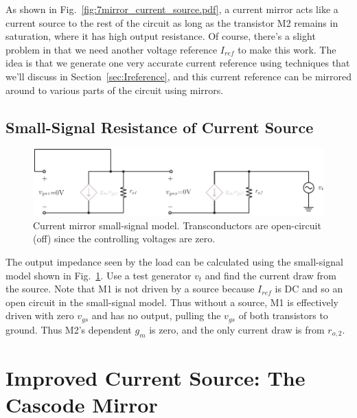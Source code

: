 As shown in Fig.~\ref{fig:7mirror_current_source.pdf}, a current mirror acts like a current source to the rest of the circuit as long as the transistor M2 remains in saturation, where it has high output resistance.  Of course, there's a slight problem in that we need another voltage reference $I_{ref}$ to make this work.  The idea is that we generate one very accurate current reference using techniques that we'll discuss in Section~\ref{sec:Ireference}, and this current reference can be mirrored around to various parts of the circuit using mirrors.  

 


\subsection{Small-Signal Resistance of Current Source}

\begin{figure}[tb]
\begin{center}
\includegraphics[scale=1]{8mirror_small_signal.pdf}
\end{center}
\caption{Current mirror small-signal model.  Transconductors are open-circuit (off) since the controlling voltages are zero.} \label{fig:8mirror_small_signal.pdf}
\end{figure}

The output impedance seen by the load can be calculated using the small-signal model shown in Fig.~\ref{fig:8mirror_small_signal.pdf}.  Use a test generator $v_t$ and find the current draw from the source.  Note that M1 is not driven by a source because $I_{ref}$ is DC and so an open circuit in the small-signal model.  Thus without a source, M1 is effectively driven with zero $v_{gs}$ and has no output, pulling the $v_{gs}$ of both transistors to ground.  Thus M2's dependent $g_m$ is zero, and the only current draw is from $r_{o,2}$.







\section{Improved Current Source:  The Cascode Mirror}



